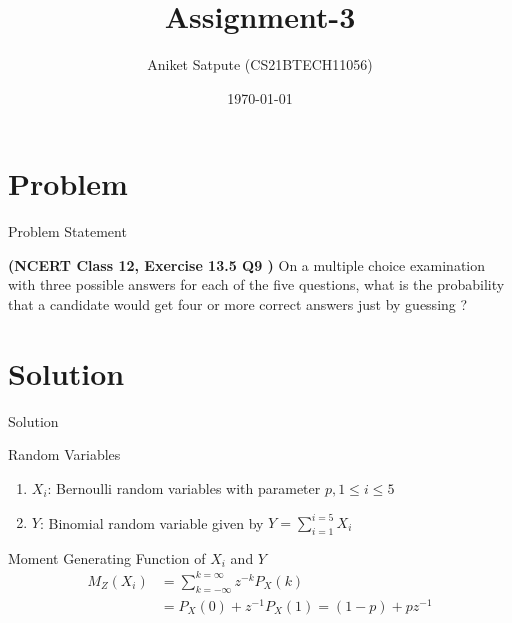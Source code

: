 \documentclass{beamer}
\title{Assignment-3}
\author{Aniket Satpute (CS21BTECH11056)}
\date{\today}
\begin{document}
\begin{frame}
    \titlepage 
\end{frame}

\logo{}



\section{Problem}
\begin{frame}{Problem Statement}

\textbf{(NCERT Class 12, Exercise 13.5 Q9 )} On a multiple choice examination with three possible answers for each of the five questions, what is the probability that a candidate would get four or more correct answers just by guessing ?

\end{frame}


\section{Solution}

\begin{frame}{Solution}
\begin{block}{Random Variables}
\begin{enumerate}
\item $X_i$: Bernoulli random variables with parameter $p, 1 \leq i \leq 5$
\item $Y$: Binomial random variable given by $Y = \sum_{i = 1}^{i = 5}X_i$
\end{enumerate}
\end{block}
\begin{exampleblock}{Moment Generating Function of $X_i$ and $Y$}
\begin{align}
M_Z(X_i) &= \sum_{k = -\infty}^{k = \infty}z^{-k}P_X(k) \\
&= P_X(0) + z^{-1}P_X(1) = (1 - p) + pz^{-1} \\
\end{align}
\end{exampleblock}
\end{frame} 
\end{document}
